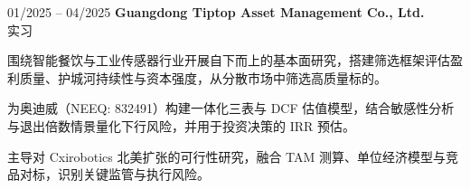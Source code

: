 \begin{twocolentry}{01/2025 – 04/2025}
\textbf{Guangdong Tiptop Asset Management Co., Ltd.} \\
实习
\end{twocolentry}

\begin{onecolentry}
\begin{highlights}
\item 围绕智能餐饮与工业传感器行业开展自下而上的基本面研究，搭建筛选框架评估盈利质量、护城河持续性与资本强度，从分散市场中筛选高质量标的。
\item 为奥迪威（NEEQ: 832491）构建一体化三表与 DCF 估值模型，结合敏感性分析与退出倍数情景量化下行风险，并用于投资决策的 IRR 预估。
\item 主导对 Cxirobotics 北美扩张的可行性研究，融合 TAM 测算、单位经济模型与竞品对标，识别关键监管与执行风险。
\end{highlights}
\end{onecolentry}
